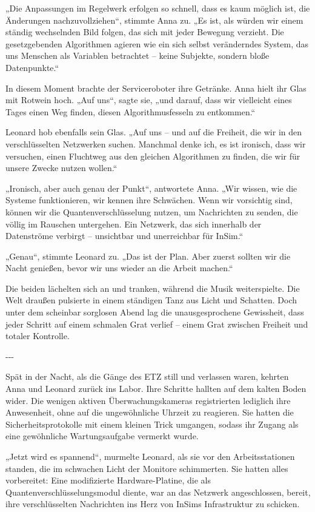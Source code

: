 \documentclass[
]{article}
\begin{document}
„Die Anpassungen im Regelwerk erfolgen so schnell, dass es kaum möglich ist, die Änderungen nachzuvollziehen``, stimmte Anna zu. „Es ist, als würden wir einem ständig wechselnden Bild folgen, das sich mit jeder Bewegung verzieht. Die gesetzgebenden Algorithmen agieren wie ein sich selbst veränderndes System, das uns Menschen als Variablen betrachtet -- keine Subjekte, sondern bloße Datenpunkte.``

In diesem Moment brachte der Serviceroboter ihre Getränke. Anna hielt ihr Glas mit Rotwein hoch. „Auf uns``, sagte sie, „und darauf, dass wir vielleicht eines Tages einen Weg finden, diesen Algorithmusfesseln zu entkommen.``

Leonard hob ebenfalls sein Glas. „Auf uns -- und auf die Freiheit, die wir in den verschlüsselten Netzwerken suchen. Manchmal denke ich, es ist ironisch, dass wir versuchen, einen Fluchtweg aus den gleichen Algorithmen zu finden, die wir für unsere Zwecke nutzen wollen.``

„Ironisch, aber auch genau der Punkt``, antwortete Anna. „Wir wissen, wie die Systeme funktionieren, wir kennen ihre Schwächen. Wenn wir vorsichtig sind, können wir die Quantenverschlüsselung nutzen, um Nachrichten zu senden, die völlig im Rauschen untergehen. Ein Netzwerk, das sich innerhalb der Datenströme verbirgt -- unsichtbar und unerreichbar für InSim.``

„Genau``, stimmte Leonard zu. „Das ist der Plan. Aber zuerst sollten wir die Nacht genießen, bevor wir uns wieder an die Arbeit machen.``

Die beiden lächelten sich an und tranken, während die Musik weiterspielte. Die Welt draußen pulsierte in einem ständigen Tanz aus Licht und Schatten. Doch unter dem scheinbar sorglosen Abend lag die unausgesprochene Gewissheit, dass jeder Schritt auf einem schmalen Grat verlief -- einem Grat zwischen Freiheit und totaler Kontrolle.

-\/-\/-

Spät in der Nacht, als die Gänge des ETZ still und verlassen waren, kehrten Anna und Leonard zurück ins Labor. Ihre Schritte hallten auf dem kalten Boden wider. Die wenigen aktiven Überwachungskameras registrierten lediglich ihre Anwesenheit, ohne auf die ungewöhnliche Uhrzeit zu reagieren. Sie hatten die Sicherheitsprotokolle mit einem kleinen Trick umgangen, sodass ihr Zugang als eine gewöhnliche Wartungsaufgabe vermerkt wurde.

„Jetzt wird es spannend``, murmelte Leonard, als sie vor den Arbeitsstationen standen, die im schwachen Licht der Monitore schimmerten. Sie hatten alles vorbereitet: Eine modifizierte Hardware-Platine, die als Quantenverschlüsselungsmodul diente, war an das Netzwerk angeschlossen, bereit, ihre verschlüsselten Nachrichten ins Herz von InSims Infrastruktur zu schicken.
\end{document}
